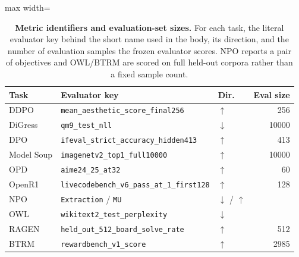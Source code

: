 \begin{table}[t]
\centering
\caption{\textbf{Metric identifiers and evaluation-set sizes.} For each task, the literal evaluator
key behind the short name used in the body, its direction, and the number of evaluation samples the
frozen evaluator scores. NPO reports a pair of objectives and OWL/BTRM are scored on full held-out
corpora rather than a fixed sample count.}
\label{tab:metrickeys}
\small
\begin{adjustbox}{max width=\linewidth}
\begin{tabular}{lllr}
\toprule
\textbf{Task} & \textbf{Evaluator key} & \textbf{Dir.} & \textbf{Eval size} \\
\midrule
DDPO & \texttt{mean\_aesthetic\_score\_final256} & $\uparrow$ & 256 \\
DiGress & \texttt{qm9\_test\_nll} & $\downarrow$ & 10000 \\
DPO & \texttt{ifeval\_strict\_accuracy\_hidden413} & $\uparrow$ & 413 \\
Model Soup & \texttt{imagenetv2\_top1\_full10000} & $\uparrow$ & 10000 \\
OPD & \texttt{aime24\_25\_at32} & $\uparrow$ & 60 \\
OpenR1 & \texttt{livecodebench\_v6\_pass\_at\_1\_first128} & $\uparrow$ & 128 \\
NPO & \texttt{Extraction} / \texttt{MU} & $\downarrow$ / $\uparrow$ & \na{} \\
OWL & \texttt{wikitext2\_test\_perplexity} & $\downarrow$ & \na{} \\
RAGEN & \texttt{held\_out\_512\_board\_solve\_rate} & $\uparrow$ & 512 \\
BTRM & \texttt{rewardbench\_v1\_score} & $\uparrow$ & 2985 \\
\bottomrule
\end{tabular}
\end{adjustbox}
\end{table}
